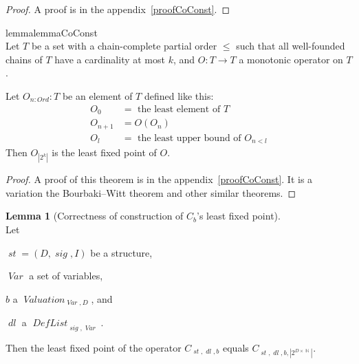 \documentclass[oneside,12pt]{book}
\theoremstyle{definition}
\newtheorem{lemma}[theorem]{Lemma}
\theoremstyle{remark}
\newcommand\var[1]{\mathop{\mathit{#1}}\nolimits}
\newcommand{\sig}{\var{sig}}
\newcommand{\st}{\var{st}}
\newcommand{\Var}{\var{Var}}
\newcommand{\Valuation}{\var{Valuation}}
\newcommand{\DefList}{\var{DefList}}
\newcommand{\dl}{\var{dl}}
\newcommand{\Nat}{\var{\mathbb{N}}}
\begin{document}
\begin{proof}
  A proof is in the appendix~\ref{proofCoConst}.
\end{proof}

\begin{restatable}%
{lemma}{lemmaCoConst} \label{coConst} \hfill \\
  Let $T$ be a set with a chain-complete partial order $\leq$ such that
  all well-founded chains of $T$ have a cardinality at most $k$,
  and $O\colon T \to T$ a monotonic operator on $T$.
  
  Let $O_{n\colon Ord}\colon T$ be an element of $T$ defined like this:
  \begin{align*}
      O_0 & = \text{ the least element of }T \\
      O_{n+1} & = O(O_n) \\
      O_l & = \text{ the least upper bound of }O_{n<l}
  \end{align*}
  Then $O_{|2^k|}$ is the least fixed point of $O$.
\end{restatable}

\begin{proof}
  A proof of this theorem is in the appendix~\ref{proofCoConst}.
  It is a variation the Bourbaki--Witt theorem and other similar theorems.
\end{proof}

\begin{lemma}[Correctness of construction of $C_b$'s least fixed point]
\label{coConstOpC} \hfill \\
  Let
  \begin{compactitem}
    \item $\st = (D, \sig, I)$ be a structure,
    \item $\Var$ a set of variables,
    \item $b$ a $\Valuation_{\Var,D}$, and
    \item $\dl$ a $\DefList_{\sig,\Var}$.
  \end{compactitem}
  
  \medskip \noindent Then the least fixed point of the operator $C_{\st,\dl,b}$
  equals $C_{\st,\dl,b,|2^{D \times \Nat}|}$.
\end{lemma}
\end{document}
